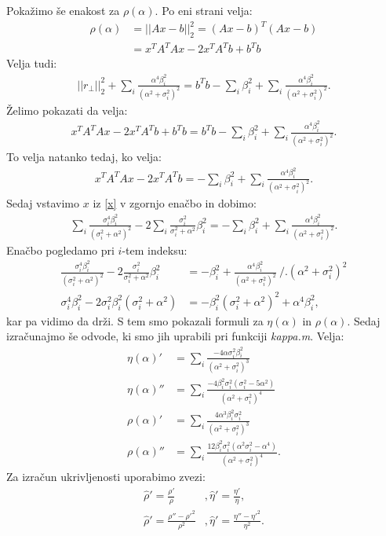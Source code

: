 \documentclass[a4paper,12pt]{article}
\begin{document}
Pokažimo še enakost za $\rho(\alpha).$  Po eni strani velja:
\begin{align*}
	\rho(\alpha) &= ||Ax-b||_2^2 = (Ax-b)^T(Ax-b)\\
	&= x^TA^TAx - 2x^TA^Tb + b^Tb
\end{align*}
Velja tudi:
\begin{align*}
	||r_{\perp}||_2^2 + \sum_{i}\frac{\alpha^4\beta_i^2}{(\alpha^2+\sigma_i^2)^2} = b^Tb - \sum_{i}\beta_i^2 + \sum_{i}\frac{\alpha^4\beta_i^2}{(\alpha^2+\sigma_i^2)^2}.
\end{align*}
Želimo pokazati da velja: 
\begin{align*}
	x^TA^TAx - 2x^TA^Tb + b^Tb = b^Tb - \sum_{i}\beta_i^2 + \sum_{i}\frac{\alpha^4\beta_i^2}{(\alpha^2+\sigma_i^2)^2}.
\end{align*}
To velja natanko tedaj, ko velja: 
\begin{align*}
x^TA^TAx - 2x^TA^Tb  = - \sum_{i}\beta_i^2 + \sum_{i}\frac{\alpha^4\beta_i^2}{(\alpha^2+\sigma_i^2)^2}.
\end{align*}
Sedaj vstavimo $x$ iz \eqref{x} v zgornjo enačbo in dobimo:
\begin{align*}
\sum_{i}\frac{\sigma_i^4\beta_i^2}{(\sigma_i^2+\alpha^2)^2} - 2\sum_{i}\frac{\sigma_i^2}{\sigma_i^2+\alpha^2}\beta_i^2 = - \sum_{i}\beta_i^2 + \sum_{i}\frac{\alpha^4\beta_i^2}{(\alpha^2+\sigma_i^2)^2}.
\end{align*}
Enačbo pogledamo pri $i$-tem indeksu:
\begin{align*}
\frac{\sigma_i^4\beta_i^2}{(\sigma_i^2+\alpha^2)^2} - 2\frac{\sigma_i^2}{\sigma_i^2+\alpha^2}\beta_i^2 &= - \beta_i^2 + \frac{\alpha^4\beta_i^2}{(\alpha^2+\sigma_i^2)^2} ~ /.(\alpha^2+\sigma_i^2)^2\\
\sigma_i^4\beta_i^2 - 2\sigma_i^2\beta_i^2(\sigma_i^2+\alpha^2) &= -\beta_i^2(\sigma_i^2+\alpha^2)^2 + \alpha^4\beta_i^2,
\end{align*}
kar pa vidimo da drži. S tem smo pokazali formuli za $\eta(\alpha)$ in $\rho(\alpha).$ Sedaj izračunajmo še odvode, ki smo jih uprabili pri funkciji \emph{kappa.m}.
Velja:
\begin{align*}
	\eta(\alpha)' &= \sum_{i}\frac{-4\alpha\sigma_i^2\beta_i^2}{(\alpha^2+\sigma_i^2)^3} \\
	\eta(\alpha)'' &= \sum_{i}\frac{-4\beta_i^2\sigma_i^2(\sigma_i^2-5\alpha^2)}{(\alpha^2 + \sigma_i^2)^4}\\
	\rho(\alpha)' &= \sum_{i}\frac{4\alpha^3\beta_i^2\sigma_i^2}{(\alpha^2+\sigma_i^2)^3} \\
	\rho(\alpha)'' &= \sum_{i} \frac{12\beta_i^2\sigma_i^2(\alpha^2\sigma_i^2-\alpha^4)}{(\alpha^2+\sigma_i^2)^4}.
\end{align*}
Za izračun ukrivljenosti uporabimo zvezi:
\begin{align*}
	\widehat{\rho}' = \frac{\rho'}{\rho}&, \widehat{\eta}' = \frac{\eta'}{\eta},\\
	\widehat{\rho}' = \frac{\rho''-\rho'^2}{\rho^2}&, \widehat{\eta}' = \frac{\eta''-\eta'^2}{\eta^2}.
\end{align*}
\end{document}

